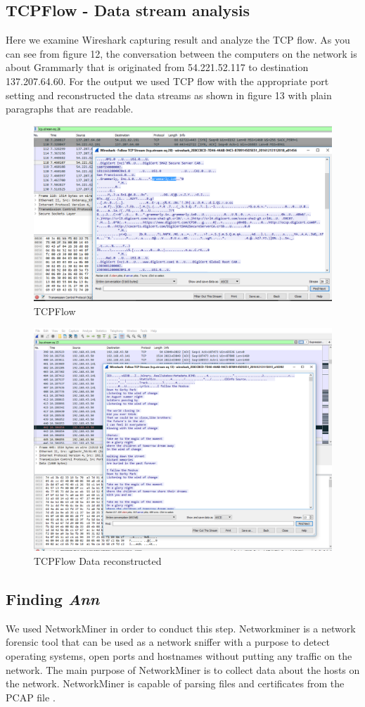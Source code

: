 \documentclass{article}
\begin{document}
\subsection{TCPFlow - Data stream analysis}
Here we examine Wireshark capturing result and analyze the TCP flow. As you can see from figure 12, the conversation between the computers on the network is about Grammarly that is originated from 54.221.52.117 to destination 137.207.64.60. For the output we used TCP flow with the appropriate port setting and reconstructed the data streams as shown in figure 13 with plain paragraphs that are readable. 
\begin{figure}[H]
	\begin{center}
		\includegraphics[width=0.6
\textwidth]{TCPFLOW1.png}
	\end{center}
	\caption{TCPFlow}
	\label{fig:Prd}
\end{figure}

\begin{figure}[H]
	\begin{center}
		\includegraphics[width=0.6
\textwidth]{TCPFLOW2.png}
	\end{center}
	\caption{TCPFlow Data reconstructed}
	\label{fig:Prd}
\end{figure}

\subsection{Finding \textit{{Ann}}}
We used NetworkMiner in order to conduct this step. Networkminer is a network forensic tool that can be used as a network sniffer with a purpose to detect operating systems, open ports and hostnames without putting any traffic on the network. The main purpose of NetworkMiner is to collect data about the hosts on the network. NetworkMiner is capable of parsing files and certificates from the PCAP file \cite{crenshaw2008osfuscate}.
\end{document}
